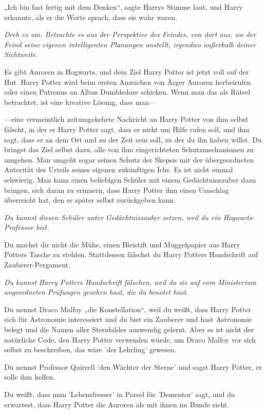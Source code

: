 {„Ich bin fast fertig mit dem Denken“, sagte Harrys Stimme laut, und Harry erkannte, als er die Worte sprach, dass sie wahr waren.

\emph{Dreh es um. Betrachte es aus der Perspektive des Feindes, von dort aus, wo der Feind seine eigenen intelligenten Planungen anstellt, irgendwo außerhalb deiner Sichtweite.}

Es gibt Auroren in Hogwarts, und dein Ziel Harry Potter ist jetzt voll auf der Hut. Harry Potter wird beim ersten Anzeichen von Ärger Auroren herbeirufen oder einen Patronus an Albus Dumbledore schicken. Wenn man das als Rätsel betrachtet, ist eine kreative Lösung, dass man—

—eine vermeintlich zeitumgekehrte Nachricht an Harry Potter von ihm selbst fälscht, in der er Harry Potter sagt, dass er nicht um Hilfe rufen soll, und ihm sagt, dass er an dem Ort und zu der Zeit sein soll, zu der du ihn haben willst. Du bringst das Ziel selbst dazu, alle von ihm eingerichteten Schutzmechanismen zu umgehen. Man umgeht sogar seinen Schutz der Skepsis mit der übergeordneten Autorität des Urteils seines eigenen zukünftigen Ichs. Es ist nicht einmal schwierig. Man kann einen beliebigen Schüler mit einem Gedächtniszauber dazu bringen, sich daran zu erinnern, dass Harry Potter ihm einen Umschlag überreicht hat, den er später selbst zurückgeben kann.

\emph{\hfill\break Du kannst diesen Schüler unter Gedächtniszauber setzen, weil du ein Hogwarts-Professor bist.}

Du machst dir nicht die Mühe, einen Bleistift und Muggelpapier aus Harry Potters Tasche zu stehlen. Stattdessen fälschst du Harry Potters Handschrift auf Zauberer-Pergament.

\emph{Du kannst Harry Potters Handschrift fälschen, weil du sie auf vom Ministerium angeordneten Prüfungen gesehen hast, die du benotet hast.}

Du nennst Draco Malfoy „die Konstellation“, weil du weißt, dass Harry Potter sich für Astronomie interessiert und du bist ein Zauberer und hast Astronomie belegt und die Namen aller Sternbilder auswendig gelernt. Aber es ist nicht der natürliche Code, den Harry Potter verwenden würde, um Draco Malfoy vor sich selbst zu beschreiben, das wäre 'der Lehrling' gewesen.

Du nennst Professor Quirrell 'den Wächter der Sterne' und sagst Harry Potter, er solle ihm helfen.

Du weißt, dass man 'Lebensfresser' in Parsel für 'Dementor' sagt, und du erwartest, dass Harry Potter die Auroren als mit ihnen im Bunde sieht.

}

